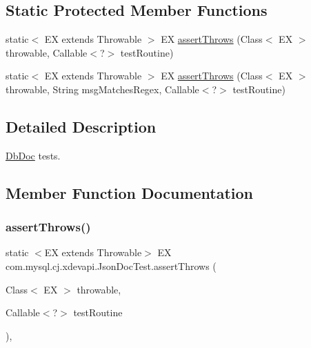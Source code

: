 \subsection*{Static Protected Member Functions}
\begin{DoxyCompactItemize}
\item 
static$<$ EX extends Throwable $>$ EX \mbox{\hyperlink{classcom_1_1mysql_1_1cj_1_1xdevapi_1_1_json_doc_test_aa0bf76b32940e1bc6b8b944f7580f13a}{assert\+Throws}} (Class$<$ EX $>$ throwable, Callable$<$?$>$ test\+Routine)
\item 
static$<$ EX extends Throwable $>$ EX \mbox{\hyperlink{classcom_1_1mysql_1_1cj_1_1xdevapi_1_1_json_doc_test_a3e6c08cae926e367bfadcd96c7d431d6}{assert\+Throws}} (Class$<$ EX $>$ throwable, String msg\+Matches\+Regex, Callable$<$?$>$ test\+Routine)
\end{DoxyCompactItemize}


\subsection{Detailed Description}
\mbox{\hyperlink{interfacecom_1_1mysql_1_1cj_1_1xdevapi_1_1_db_doc}{Db\+Doc}} tests. 

\subsection{Member Function Documentation}
\mbox{\label{classcom_1_1mysql_1_1cj_1_1xdevapi_1_1_json_doc_test_aa0bf76b32940e1bc6b8b944f7580f13a}} 
\subsubsection{\texorpdfstring{assert\+Throws()}{assertThrows()}\hspace{0.1cm}{\footnotesize\ttfamily [1/2]}}
{\footnotesize\ttfamily static $<$EX extends Throwable$>$ EX com.\+mysql.\+cj.\+xdevapi.\+Json\+Doc\+Test.\+assert\+Throws (\begin{DoxyParamCaption}\item[{Class$<$ EX $>$}]{throwable,  }\item[{Callable$<$?$>$}]{test\+Routine }\end{DoxyParamCaption})\hspace{0.3cm}{\ttfamily [static]}, {\ttfamily [protected]}}

